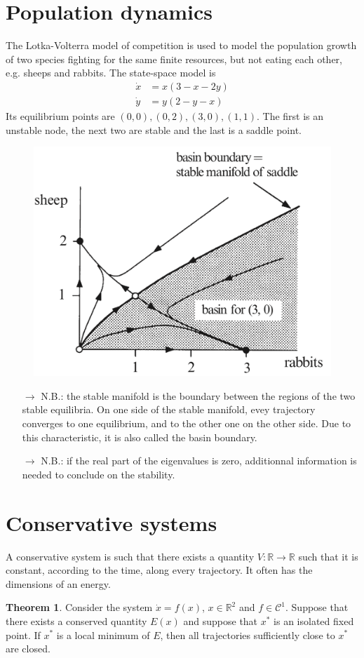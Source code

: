 \documentclass[12pt, openany]{report}
\theoremstyle{definition}
\newtheorem{thm}{Theorem}[chapter]
\newcommand{\R}{\mathbb{R}}
\begin{document}
\section{Population dynamics}
The Lotka-Volterra model of competition is used to model the population growth of two species fighting for the same finite resources, but not eating each other, e.g. sheeps and rabbits. The state-space model is
\begin{align}
    \dot x &= x(3-x-2y)\nonumber \\
    \dot y &= y(2-y-x)
\end{align}    
Its equilibrium points are \((0,0), (0,2),(3,0),(1,1)\). The first is an unstable node, the next two are stable and the last is a saddle point. 
\begin{figure}[H]
    \centering
    \includegraphics[width = .5\textwidth]{img/basin_of_attraction.png}
\end{figure}
\begin{itemize}
    \item [\(\rightarrow\)] N.B.: the stable manifold is the boundary between the regions of the two stable equilibria. On one side of the stable manifold, evey trajectory converges to one equilibrium, and to the other one on the other side. Due to this characteristic, it is also called the basin boundary. 
    \item [\(\rightarrow\)] N.B.: if the real part of the eigenvalues is zero, additionnal information is needed to conclude on the stability. 
\end{itemize}
\section{Conservative systems}
A conservative system is such that there exists a quantity \(V:\R\rightarrow \R\) such that it is constant, according to the time, along every trajectory. It often has the dimensions of an energy. 
\begin{thm}
    Consider the system \(\dot x=f(x)\), \(x\in \R^2\) and \(f\in \mathcal{C}^1\). Suppose that there exists a conserved quantity \(E(x)\) and suppose that \(x^*\) is an isolated fixed point. If \(x^*\) is a local minimum of \(E\), then all trajectories sufficiently close to \(x^*\) are closed.
\end{thm}
\end{document}
